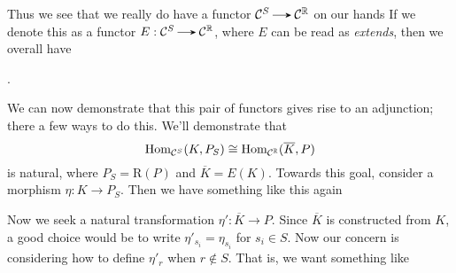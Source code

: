 Thus we see that we really do have a functor $\cc^{S} \to \cc^{\rr}$ on our hands
If we denote this as a functor $E: \cc^{S} \to \cc^{\rr}$, 
where $E$ can be read as \emph{extends}, then we overall have 
\begin{center}
    .
\end{center}
We can now demonstrate that this pair of functors gives rise to an adjunction; there 
a few ways to do this. We'll demonstrate that 
\[
    \operatorname{\mathrm{Hom}}_{\mathcal{C}^{S}}(K, P_S) \cong \operatorname{\mathrm{Hom}}_{\mathcal{C}^{\mathbb{R}}}(\overline{K}, P)
\] 
is natural, where $P_S = \text{R}(P)$ and $\overline{K} = E(K)$. Towards this 
goal, consider a morphism $\eta: K \to P_S$. Then we have something like this 
again 
\begin{center}
\end{center}
Now we seek a natural transformation $\eta': \overline{K} \to P$. Since $\overline{K}$ 
is constructed from $K$, a good choice would be to write 
$\eta'_{s_i} = \eta_{s_i}$ for $s_i \in S$. 
Now our concern is considering how to define $\eta'_r$
when $r \not \in S$. That is, we want something like 
\begin{center}
\end{center}

